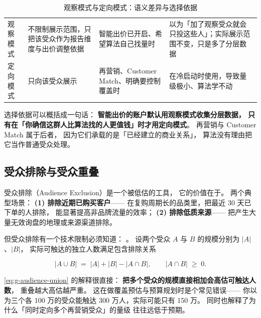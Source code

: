 \begin{table}[htbp]
\centering
\caption{观察模式与定向模式：语义差异与选择依据}
\label{tab:g-observe-target}
\small
\begin{tabularx}{\textwidth}{L{2.2cm} L{3.2cm} L{3.0cm} Y}
\toprule
{} &  &  &  \\
\midrule
观察模式 & 不限制展示范围，只把该受众作为报告维度与出价调整依据 & 智能出价已开启、希望算法自己找量时 & 以为「加了观察受众就会只投这些人」；实际展示范围不变，只是多了分层数据 \\
\addlinespace
定向模式 & 只向该受众展示 & 再营销、Customer Match、明确要控制覆盖时 & 在冷启动时使用，导致量级极小、算法学不动 \\
\bottomrule
\end{tabularx}
\end{table}

选择依据可以概括成一句话：
\textbf{智能出价的账户默认用观察模式收集分层数据，
只有在「你确信这群人比算法找的人更值钱」时才用定向模式}。
再营销与 Customer Match 属于后者，
因为它们承载的是「已经建立的商业关系」，
算法没有理由把它当作普通受众处理。

\subsection{受众排除与受众重叠}

受众排除（Audience Exclusion）是一个被低估的工具，
它的价值在于。
两个典型场景：
\textbf{(1) 排除近期已购买客户}——
在复购周期长的品类里，把最近 30 天已下单的人排除，
能显著提高非品牌流量的效率；
\textbf{(2) 排除低质来源}——
把产生大量无效询盘的地理或来源渠道排除。

但受众排除有一个技术限制必须知道：
。
设两个受众 $A$ 与 $B$ 的规模分别为 $|A|$、$|B|$，
实际可触达的独立人数满足包含排除关系

\begin{equation}
\bigl|A \cup B\bigr| \;=\; |A| + |B| - \bigl|A \cap B\bigr| ,
\qquad
\bigl|A \cap B\bigr| \;\ge\; 0 .
\label{eq:g-audience-union}
\end{equation}

\cref{eq:g-audience-union} 的解释很直接：
\textbf{把多个受众的规模直接相加会高估可触达人数}，
重叠越大高估越严重。
这在做覆盖预估与预算规划时是个常见错误——
你以为三个各 100 万的受众能触达 300 万人，实际可能只有 150 万。
同时也解释了为什么「同时定向多个再营销受众」的量级
往往远低于预期。

